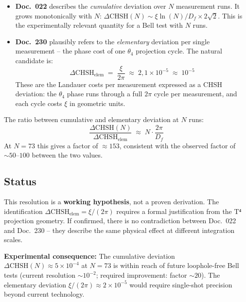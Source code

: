 \begin{itemize}
  \item \textbf{Doc.~022} describes the \emph{cumulative} deviation over $N$
        measurement runs. It grows monotonically with $N$:
        $\Delta\text{CHSH}(N) \sim \xi\ln(N)/D_f \times 2\sqrt{2}$. This is the
        experimentally relevant quantity for a Bell test with $N$ runs.

  \item \textbf{Doc.~230} plausibly refers to the \emph{elementary} deviation
        per single measurement -- the phase cost of one $\theta_4$ projection
        cycle. The natural candidate is:
        \begin{equation}
          \Delta\text{CHSH}_\text{elem}
          \;=\; \frac{\xi}{2\pi}
          \;\approx\; 2{,}1\times10^{-5}
          \;\approx\; 10^{-5}
          \tag{190.21}
        \end{equation}
        These are the Landauer costs per measurement expressed as a CHSH
        deviation: the $\theta_4$ phase runs through a full $2\pi$ cycle per
        measurement, and each cycle costs $\xi$ in geometric units.
\end{itemize}

The ratio between cumulative and elementary deviation at $N$ runs:
\begin{equation}
  \frac{\Delta\text{CHSH}(N)}{\Delta\text{CHSH}_\text{elem}}
  \;\approx\; N\cdot\frac{2\pi}{D_f}
  \tag{190.22}
\end{equation}
At $N=73$ this gives a factor of $\approx 153$, consistent with the observed
factor of $\sim50$--$100$ between the two values.

\subsection*{Status}

This resolution is a \textbf{working hypothesis}, not a proven derivation. The
identification $\Delta\text{CHSH}_\text{elem} = \xi/(2\pi)$ requires a formal
justification from the T⁴ projection geometry. If confirmed, there is no
contradiction between Doc.~022 and Doc.~230 -- they describe the same physical
effect at different integration scales.

\textbf{Experimental consequence:} The cumulative deviation
$\Delta\text{CHSH}(N) \approx 5\times10^{-4}$ at $N=73$ is within reach of
future loophole-free Bell tests (current resolution $\sim10^{-2}$; required
improvement: factor $\sim20$). The elementary deviation
$\xi/(2\pi) \approx 2\times10^{-5}$ would require single-shot precision beyond
current technology.


